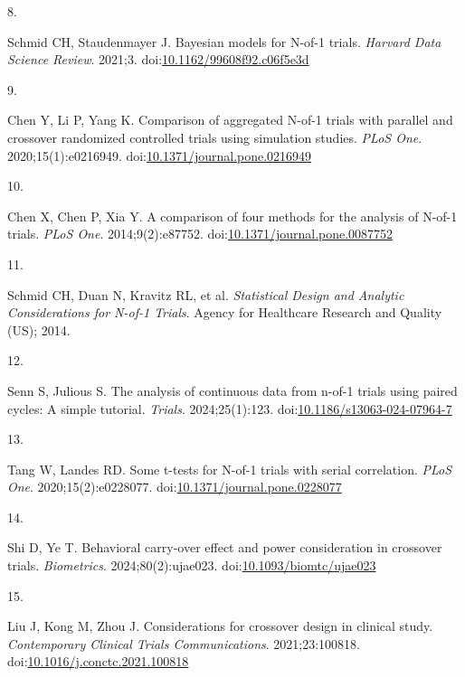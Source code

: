 \documentclass[
  11pt,
]{article}
\newlength{\cslhangindent}
\newlength{\csllabelwidth}
\newenvironment{CSLReferences}[2] %
 {\begin{list}{}{%
  \setlength{\itemindent}{0pt}
  \setlength{\leftmargin}{0pt}
  \setlength{\parsep}{0pt}
  \ifodd #1
   \setlength{\leftmargin}{\cslhangindent}
   \setlength{\itemindent}{-1\cslhangindent}
  \fi
  \setlength{\itemsep}{#2\baselineskip}}}
 {\end{list}}
\newcommand{\CSLLeftMargin}[1]{\parbox[t]{\csllabelwidth}{\strut#1\strut}}
\newcommand{\CSLRightInline}[1]{\parbox[t]{\linewidth - \csllabelwidth}{\strut#1\strut}}
\begin{document}
\begin{CSLReferences}{0}{1}
\CSLLeftMargin{8. }%
\CSLRightInline{Schmid CH, Staudenmayer J. Bayesian models for {N-of-1}
trials. \emph{Harvard Data Science Review}. 2021;3.
doi:\href{https://doi.org/10.1162/99608f92.c06f5e3d}{10.1162/99608f92.c06f5e3d}}

\CSLLeftMargin{9. }%
\CSLRightInline{Chen Y, Li P, Yang K. Comparison of aggregated {N-of-1}
trials with parallel and crossover randomized controlled trials using
simulation studies. \emph{PLoS One}. 2020;15(1):e0216949.
doi:\href{https://doi.org/10.1371/journal.pone.0216949}{10.1371/journal.pone.0216949}}

\CSLLeftMargin{10. }%
\CSLRightInline{Chen X, Chen P, Xia Y. A comparison of four methods for
the analysis of {N-of-1} trials. \emph{PLoS One}. 2014;9(2):e87752.
doi:\href{https://doi.org/10.1371/journal.pone.0087752}{10.1371/journal.pone.0087752}}

\CSLLeftMargin{11. }%
\CSLRightInline{{Schmid CH, Duan N, Kravitz RL, et al.}
\emph{Statistical Design and Analytic Considerations for {N-of-1}
Trials}. {Agency for Healthcare Research and Quality (US)}; 2014.}

\CSLLeftMargin{12. }%
\CSLRightInline{Senn S, Julious S. The analysis of continuous data from
n-of-1 trials using paired cycles: A simple tutorial. \emph{Trials}.
2024;25(1):123.
doi:\href{https://doi.org/10.1186/s13063-024-07964-7}{10.1186/s13063-024-07964-7}}

\CSLLeftMargin{13. }%
\CSLRightInline{Tang W, Landes RD. Some t-tests for {N-of-1} trials with
serial correlation. \emph{PLoS One}. 2020;15(2):e0228077.
doi:\href{https://doi.org/10.1371/journal.pone.0228077}{10.1371/journal.pone.0228077}}

\CSLLeftMargin{14. }%
\CSLRightInline{Shi D, Ye T. Behavioral carry-over effect and power
consideration in crossover trials. \emph{Biometrics}.
2024;80(2):ujae023.
doi:\href{https://doi.org/10.1093/biomtc/ujae023}{10.1093/biomtc/ujae023}}

\CSLLeftMargin{15. }%
\CSLRightInline{Liu J, Kong M, Zhou J. Considerations for crossover
design in clinical study. \emph{Contemporary Clinical Trials
Communications}. 2021;23:100818.
doi:\href{https://doi.org/10.1016/j.conctc.2021.100818}{10.1016/j.conctc.2021.100818}}


\end{CSLReferences}
\end{document}
